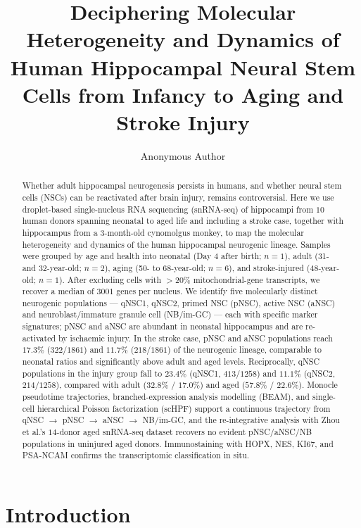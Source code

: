 \documentclass[11pt]{article}
\title{Deciphering Molecular Heterogeneity and Dynamics of Human Hippocampal Neural Stem Cells from Infancy to Aging and Stroke Injury}
\author[1]{Anonymous Author}
\affil[1]{Anonymous Institution}
\date{}
\begin{document}
\maketitle

\begin{abstract}
Whether adult hippocampal neurogenesis persists in humans, and whether neural stem cells (NSCs) can be reactivated after brain injury, remains controversial. Here we use droplet-based single-nucleus RNA sequencing (snRNA-seq) of hippocampi from $10$ human donors spanning neonatal to aged life and including a stroke case, together with hippocampus from a 3-month-old cynomolgus monkey, to map the molecular heterogeneity and dynamics of the human hippocampal neurogenic lineage. Samples were grouped by age and health into neonatal (Day 4 after birth; $n = 1$), adult (31- and 32-year-old; $n = 2$), aging (50- to 68-year-old; $n = 6$), and stroke-injured (48-year-old; $n = 1$). After excluding cells with $>20\%$ mitochondrial-gene transcripts, we recover a median of $3001$ genes per nucleus. We identify five molecularly distinct neurogenic populations --- qNSC1, qNSC2, primed NSC (pNSC), active NSC (aNSC) and neuroblast/immature granule cell (NB/im-GC) --- each with specific marker signatures; pNSC and aNSC are abundant in neonatal hippocampus and are re-activated by ischaemic injury. In the stroke case, pNSC and aNSC populations reach $17.3\%$ ($322/1861$) and $11.7\%$ ($218/1861$) of the neurogenic lineage, comparable to neonatal ratios and significantly above adult and aged levels. Reciprocally, qNSC populations in the injury group fall to $23.4\%$ (qNSC1, $413/1258$) and $11.1\%$ (qNSC2, $214/1258$), compared with adult ($32.8\%$ / $17.0\%$) and aged ($57.8\%$ / $22.6\%$). Monocle pseudotime trajectories, branched-expression analysis modelling (BEAM), and single-cell hierarchical Poisson factorization (scHPF) support a continuous trajectory from qNSC $\to$ pNSC $\to$ aNSC $\to$ NB/im-GC, and the re-integrative analysis with Zhou et al.'s $14$-donor aged snRNA-seq dataset recovers no evident pNSC/aNSC/NB populations in uninjured aged donors. Immunostaining with HOPX, NES, KI67, and PSA-NCAM confirms the transcriptomic classification in situ.
\end{abstract}

\section{Introduction}
\end{document}

